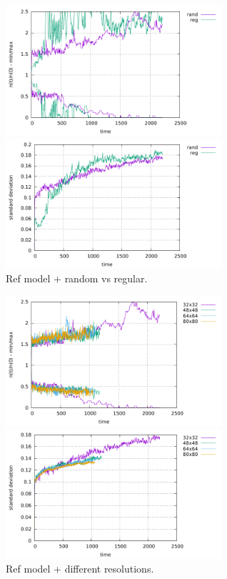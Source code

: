 \begin{center}
\includegraphics[width=8cm]{python_codes/fieldstone_30/results_solcx/markercount_reg}
\includegraphics[width=8cm]{python_codes/fieldstone_30/results_solcx/stdev_reg}\\
{\captionfont Ref model + random vs regular.} 
\end{center}

\begin{center}
\includegraphics[width=8cm]{python_codes/fieldstone_30/results_solcx/markercount_res}
\includegraphics[width=8cm]{python_codes/fieldstone_30/results_solcx/stdev_res}\\
{\captionfont Ref model + different resolutions.}
\end{center}

